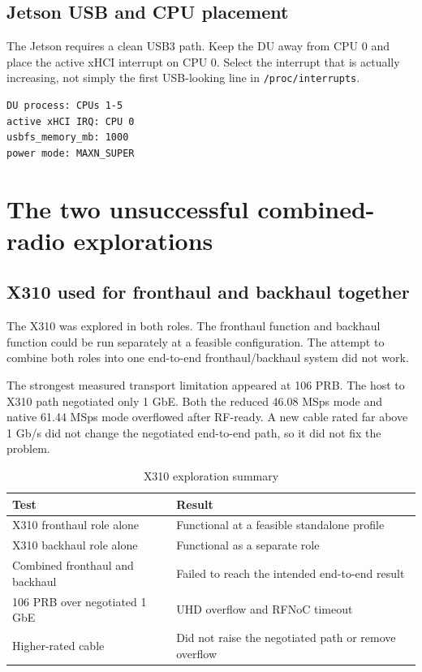 \documentclass[11pt,a4paper]{article}
\begin{document}
\subsection{Jetson USB and CPU placement}

The Jetson requires a clean USB3 path. Keep the DU away from CPU 0 and place
the active xHCI interrupt on CPU 0. Select the interrupt that is actually
increasing, not simply the first USB-looking line in \texttt{/proc/interrupts}.

\begin{lstlisting}
DU process: CPUs 1-5
active xHCI IRQ: CPU 0
usbfs_memory_mb: 1000
power mode: MAXN_SUPER
\end{lstlisting}

\section{The two unsuccessful combined-radio explorations}

\subsection{X310 used for fronthaul and backhaul together}

The X310 was explored in both roles. The fronthaul function and backhaul
function could be run separately at a feasible configuration. The attempt to
combine both roles into one end-to-end fronthaul/backhaul system did not work.

The strongest measured transport limitation appeared at 106 PRB. The host to
X310 path negotiated only 1 GbE. Both the reduced 46.08 MSps mode and native
61.44 MSps mode overflowed after RF-ready. A new cable rated far above 1 Gb/s
did not change the negotiated end-to-end path, so it did not fix the problem.

\begin{table}[ht]
\centering
\caption{X310 exploration summary}
\begin{tabularx}{\textwidth}{@{}L{42mm}X@{}}
\toprule
Test & Result \\
\midrule
X310 fronthaul role alone & Functional at a feasible standalone profile \\
X310 backhaul role alone & Functional as a separate role \\
Combined fronthaul and backhaul & Failed to reach the intended end-to-end result \\
106 PRB over negotiated 1 GbE & UHD overflow and RFNoC timeout \\
Higher-rated cable & Did not raise the negotiated path or remove overflow \\
\bottomrule
\end{tabularx}
\end{table}
\end{document}
